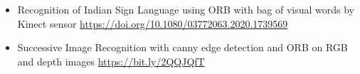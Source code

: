 \begin{itemize}[leftmargin=*,itemsep=0.0em]
    \item Recognition of Indian Sign Language using ORB with bag of visual words by Kinect sensor \url{https://doi.org/10.1080/03772063.2020.1739569}
    \item Successive Image Recognition with canny edge detection and ORB on RGB and depth images \url{https://bit.ly/2QQJQfT}
\end{itemize}
